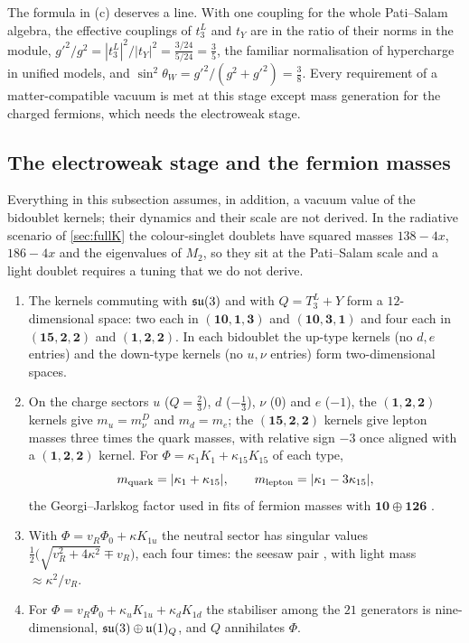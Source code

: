 The formula in (c) deserves a line. With one coupling for the whole Pati--Salam algebra, the effective couplings of $t^L_3$ and $t_Y$ are in the ratio of
their norms in the module, $g'^2/g^2=|t^L_3|^2/|t_Y|^2=\tfrac{3/24}{5/24}=\tfrac35$, the familiar normalisation of hypercharge in unified models, and
$\sin^2\theta_W=g'^2/(g^2+g'^2)=\tfrac38$. Every requirement of a matter-compatible vacuum is met at this stage except mass
generation for the charged fermions, which needs the electroweak stage.

\subsection{The electroweak stage and the fermion masses}

Everything in this subsection assumes, in addition, a vacuum value of the bidoublet kernels; their dynamics and their scale are not derived. In the radiative
scenario of \cref{sec:fullK} the colour-singlet doublets have squared masses $138-4x$, $186-4x$ and the eigenvalues of $M_2$, so they sit at the Pati--Salam
scale and a light doublet requires a tuning that we do not derive.

\begin{proposition}
\label{prop:EW}
\begin{enumerate}[label=(\roman*),leftmargin=2.2em]
\item The kernels commuting with $\mathfrak{su}(3)$ and with $Q=T^L_3+Y$ form a $12$-dimensional space: two each in $(\mathbf{10},\mathbf1,\mathbf3)$ and $(\mathbf{10},\mathbf3,\mathbf1)$ and four
each in $(\mathbf{15},\mathbf2,\mathbf2)$ and $(\mathbf1,\mathbf2,\mathbf2)$. In each bidoublet the up-type kernels (no $d,e$ entries) and the down-type kernels (no $u,\nu$ entries)
form two-dimensional spaces.
\item On the charge sectors $u$ ($Q=\tfrac23$), $d$ ($-\tfrac13$), $\nu$ ($0$) and $e$ ($-1$), the $(\mathbf1,\mathbf2,\mathbf2)$ kernels give $m_u=m_\nu^D$ and $m_d=m_e$; the
$(\mathbf{15},\mathbf2,\mathbf2)$ kernels give lepton masses three times the quark masses, with relative sign $-3$ once aligned with a $(\mathbf1,\mathbf2,\mathbf2)$ kernel. For
$\Phi=\kappa_1K_1+\kappa_{15}K_{15}$ of each type,
\[
m_{\rm quark}=|\kappa_1+\kappa_{15}|,\qquad m_{\rm lepton}=|\kappa_1-3\kappa_{15}|,
\]
the Georgi--Jarlskog factor \cite{GeorgiJarlskog79} used in fits of fermion masses with $\mathbf{10}\oplus\mathbf{126}$ \cite{BabuMohapatra93}.
\item With $\Phi=v_R\Phi_0+\kappa K_{1u}$ the neutral sector has singular values $\tfrac12\bigl(\sqrt{v_R^2+4\kappa^2}\mp v_R\bigr)$, each four times: the seesaw pair
\cite{Minkowski77,MohapatraSenjanovic80}, with light mass $\approx\kappa^2/v_R$.
\item For $\Phi=v_R\Phi_0+\kappa_uK_{1u}+\kappa_dK_{1d}$ the stabiliser among the $21$ generators is nine-dimensional, $\mathfrak{su}(3)\oplus\mathfrak{u}(1)_Q$, and $Q$ annihilates $\Phi$.
\end{enumerate}
\end{proposition}

